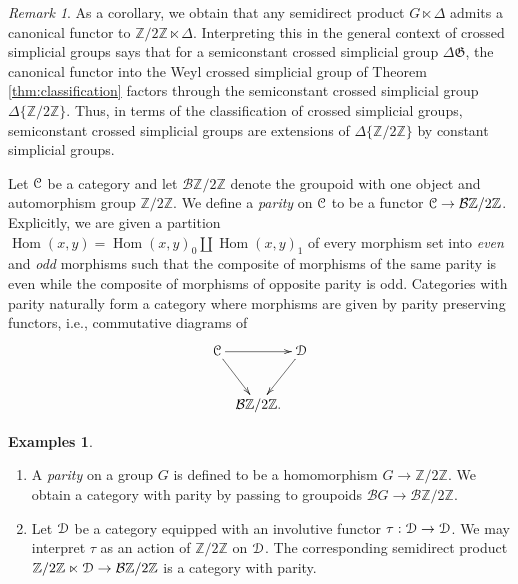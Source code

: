 \documentclass[english,11pt,leqno]{article}
\def\Gen{\mathfrak{G}}
\def\Hom{\operatorname{Hom}}
\def\Hom{\operatorname{Hom}}
\def\B{ {\EuScript B}}
\def\C{{\EuScript C}}
\def\D{{\EuScript D}}
\def\Zt{\mathbb{Z}/2\mathbb{Z}}
\def\BZt{{\mathcal B}\mathbb{Z}/2\mathbb{Z}}
\def\B{{\mathcal B}}
\def\DG{ {\Delta \Gen}}
\theoremstyle{definition}
\newtheorem{exas}[thm]{Examples}
\theoremstyle{remark}
\newtheorem{rem}[thm]{Remark}
\numberwithin{equation}{section}
\begin{document}
\begin{rem} As a corollary, we obtain that any semidirect product $G \ltimes \Delta$ admits a
	canonical functor to $\Zt \ltimes \Delta$. Interpreting this in the general context of
	crossed simplicial groups says that for a semiconstant crossed simplicial group $\DG$, the
	canonical functor into the Weyl crossed simplicial group of Theorem \ref{thm:classification} 
	factors through the semiconstant crossed simplicial group $\Delta \{\Zt\}$.
	Thus, in terms of the classification of crossed simplicial groups, semiconstant crossed
	simplicial groups are extensions of $\Delta \{\Zt\}$ by constant simplicial groups.
\end{rem}

Let $\C$ be a category and let $\BZt$ denote the groupoid with one object and automorphism group
$\Zt$. We define a {\em parity} on $\C$ to be a functor $\C \to \BZt$. Explicitly,
we are given a partition $\Hom(x,y) = \Hom(x,y)_0 \amalg \Hom(x,y)_1$ of every morphism set into
{\em even} and {\em odd} morphisms such that the composite of morphisms of the same parity is even
while the composite of morphisms of opposite parity is odd. Categories with parity naturally form a
category where morphisms are given by parity preserving functors, i.e., commutative diagrams of
\[
	\xymatrix@C=1ex{ \C \ar[rr]\ar[dr] & & \D\ar[dl]\\
	& \BZt. & }
\]

\begin{exas} 
	\begin{enumerate}
		\item A {\em parity} on a group $G$ is defined to be a homomorphism $G \to \Zt$. We
			obtain a category with parity by passing to groupoids $\B G \to
			\BZt$.
		\item Let $\D$ be a category equipped with an involutive functor $\tau: \D \to \D$.
			We may interpret $\tau$ as an action of $\Zt$ on $\D$. The corresponding 
			semidirect product $\Zt \ltimes \D \to \BZt$ is a category with parity.
	\end{enumerate}
\end{exas}
\end{document}
